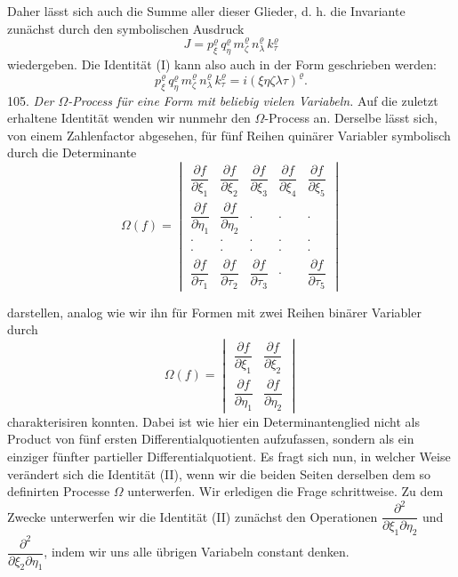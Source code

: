 \documentclass[11pt]{article}
\providecommand{\weberpage}[1]{}
\providecommand{\weq}[2]{\begin{equation}\tag{#1}#2\end{equation}}
\let\Omega\varOmega
\begin{document}
Daher lässt sich auch die Summe aller dieser Glieder, d. h. die Invariante zunächst durch den symbolischen Ausdruck
\[
J = p_\xi^\varrho\, q_\eta^\varrho\, m_\zeta^\varrho\, n_\lambda^\varrho\, k_\tau^\varrho
\]
wiedergeben. Die Identität (I) kann also auch in der Form geschrieben werden:
\weq{II}{p_\xi^\varrho\, q_\eta^\varrho\, m_\zeta^\varrho\, n_\lambda^\varrho\, k_\tau^\varrho = i (\xi\eta\zeta\lambda\tau)^\varrho.}
105. \textit{Der $\Omega$-Process für eine Form mit beliebig vielen Variabeln.} Auf die zuletzt erhaltene Identität wenden wir nunmehr den $\Omega$-Process an. Derselbe lässt sich, von einem Zahlenfactor abgesehen, für fünf Reihen quinärer Variabler symbolisch durch die Determinante
\[
\Omega(f) =
\begin{vmatrix}
\dfrac{\partial f}{\partial \xi_1} & \dfrac{\partial f}{\partial \xi_2} & \dfrac{\partial f}{\partial \xi_3} & \dfrac{\partial f}{\partial \xi_4} & \dfrac{\partial f}{\partial \xi_5}\\[6pt]
\dfrac{\partial f}{\partial \eta_1} & \dfrac{\partial f}{\partial \eta_2} & \cdot & \cdot & \cdot\\[6pt]
\cdot & \cdot & \cdot & \cdot & \cdot\\[6pt]
\cdot & \cdot & \cdot & \cdot & \cdot\\[6pt]
\dfrac{\partial f}{\partial \tau_1} & \dfrac{\partial f}{\partial \tau_2} & \dfrac{\partial f}{\partial \tau_3} & \cdot & \dfrac{\partial f}{\partial \tau_5}
\end{vmatrix}
\]


\weberpage{116}
darstellen, analog wie wir ihn für Formen mit zwei Reihen binärer Variabler durch
\[
\Omega(f) =
\begin{vmatrix}
\dfrac{\partial f}{\partial \xi_1} & \dfrac{\partial f}{\partial \xi_2}\\[6pt]
\dfrac{\partial f}{\partial \eta_1} & \dfrac{\partial f}{\partial \eta_2}
\end{vmatrix}
\]
charakterisiren konnten. Dabei ist wie hier ein Determinantenglied nicht als Product von fünf ersten Differentialquotienten aufzufassen, sondern als ein einziger fünfter partieller Differentialquotient. Es fragt sich nun, in welcher Weise verändert sich die Identität (II), wenn wir die beiden Seiten derselben dem so definirten Processe $\Omega$ unterwerfen. Wir erledigen die Frage schrittweise. Zu dem Zwecke unterwerfen wir die Identität (II) zunächst den Operationen $\dfrac{\partial^2}{\partial \xi_1 \partial \eta_2}$ und $\dfrac{\partial^2}{\partial \xi_2 \partial \eta_1}$, indem wir uns alle übrigen Variabeln constant denken.
\end{document}
